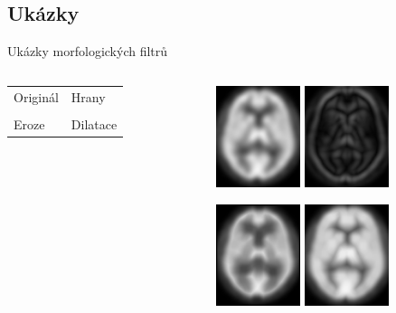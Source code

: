 \documentclass[compress,mathserif]{beamer}
\theoremstyle{definition}
\theoremstyle{plain}
\begin{document}
\subsection{Ukázky}
    \begin{frame}{Ukázky morfologických filtrů}

    \begin{columns}
    \begin{column}{0.3\textwidth}
        \begin{table}
          \begin{tabular}{ll}
            Originál \hfill & Hrany \hfill\\
            \vspace{2.5cm} & \\
            Eroze  & Dilatace \\
          \end{tabular}
        \end{table}
    \end{column}

    \begin{column}{0.6\textwidth}
    \begin{figure}
     \includegraphics[width = 70pt]{img/original.png}
             \hspace{10pt}
     \includegraphics[width = 70pt]{img/hrany.png}
    \end{figure}
    \vspace{-10pt}
    \begin{figure}
    \includegraphics[width = 70pt]{img/eroze.png}
         \hspace{10pt}
    \includegraphics[width = 70pt]{img/dilatace.png}
    \end{figure}
    \end{column}
    \end{columns}
    \end{frame}
\end{document}
